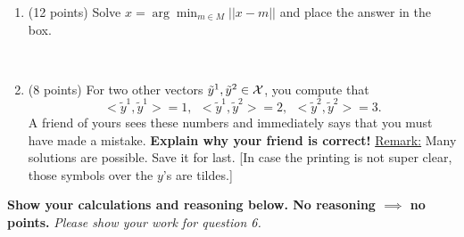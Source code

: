 \documentclass[letterpaper]{article}
\newcommand{\real}{\mathbb R}  %
\newcommand{\spanof}[1]{\textrm{span} \{ #1 \}}
\begin{document}
    \begin{enumerate}
\setlength{\itemsep}{.15in}
\renewcommand{\labelenumi}{(\alph{enumi})}
\setlength{\itemsep}{.1in}

\item  (12 points) Solve $\hat{x} = \displaystyle \arg  \min_{m\in M} ||x-m||$ and place the answer in the box. %

\\

\item  (8 points) For two other vectors $\tilde{y}^1, \tilde{y}^2 \in {\cal X}$, you compute that
$$<\tilde{y}^1,\tilde{y}^1>=1,~~ <\tilde{y}^1,\tilde{y}^2>=2,~~<\tilde{y}^2,\tilde{y}^2>=3.$$
A friend of yours sees these numbers and immediately says that you must have made a mistake. \textbf{Explain why your friend is correct!} \underline{Remark:} Many solutions are possible. Save it for last. [In case the printing is not super clear, those symbols over the $y$'s are tildes.]

\end{enumerate}



\vspace*{.3in}

 \vspace*{.3in}
 \noindent \textbf{Show your calculations and reasoning below. No reasoning $\implies$ no points.}
\newpage
\textit{Please show your work for question 6.}
\newpage



\end{document}
